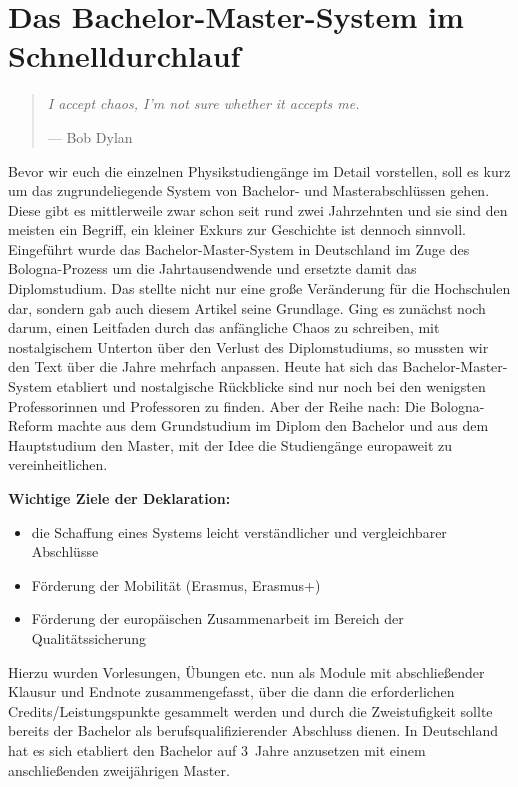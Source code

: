 \section{Das Bachelor-Master-System im Schnelldurchlauf}

\begin{multicols}{2}
\begin{quote}
	\textit{\foreignlanguage{english}{I accept chaos, I'm not sure whether it accepts me.}}

	\hfill--- Bob Dylan
\end{quote}
Bevor wir euch die einzelnen Physikstudiengänge im Detail vorstellen, soll es kurz um das zugrundeliegende System von Bachelor- und Masterabschlüssen gehen.
Diese gibt es mittlerweile zwar schon seit rund zwei Jahrzehnten und sie sind den meisten ein Begriff, ein kleiner Exkurs zur Geschichte ist dennoch sinnvoll.
Eingeführt wurde das Bachelor-Master-System in Deutschland im Zuge des Bologna-Prozess um die Jahrtausendwende und ersetzte damit das Diplomstudium.
Das stellte nicht nur eine große Veränderung für die Hochschulen dar, sondern gab auch diesem Artikel seine Grundlage.
Ging es zunächst noch darum, einen Leitfaden durch das anfängliche Chaos zu schreiben, mit nostalgischem Unterton über den Verlust des Diplomstudiums, so mussten wir den Text über die Jahre mehrfach anpassen. Heute hat sich das Bachelor-Master-System etabliert und nostalgische Rückblicke sind nur noch bei den wenigsten Professorinnen und Professoren zu finden.
Aber der Reihe nach: Die Bologna-Reform machte aus dem Grundstudium im Diplom den Bachelor und aus dem Hauptstudium den Master, mit der Idee die Studiengänge europaweit zu vereinheitlichen.

\textbf{Wichtige Ziele der Deklaration:}
\begin{itemize}
	\item die Schaffung eines Systems leicht verständlicher und vergleichbarer Abschlüsse
	\item Förderung der Mobilität (Erasmus, Erasmus+)
	\item Förderung der europäischen Zusammenarbeit im Bereich der Qualitätssicherung
\end{itemize}

Hierzu wurden Vorlesungen, Übungen etc. nun als Module mit abschließender Klausur und Endnote zusammengefasst, über die dann die erforderlichen Credits/Leistungspunkte gesammelt werden und durch die Zweistufigkeit sollte bereits der Bachelor als berufsqualifizierender Abschluss dienen.
In Deutschland hat es sich etabliert den Bachelor auf 3~Jahre anzusetzen mit einem anschließenden zweijährigen Master.


\end{multicols}
